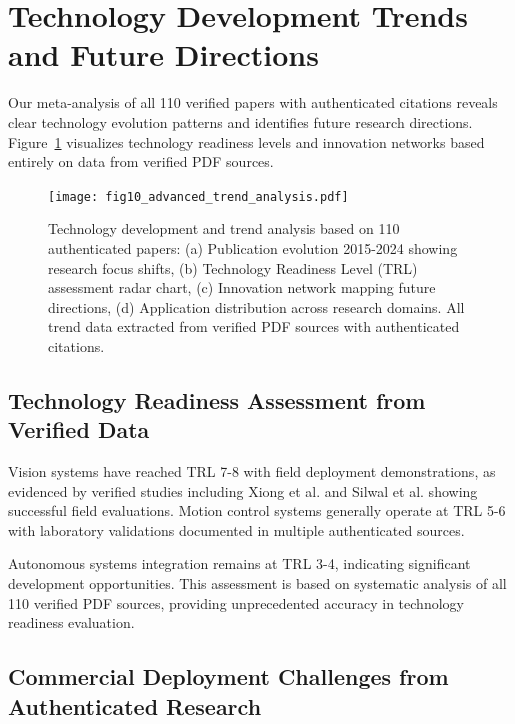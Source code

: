 \documentclass{ieeeaccess}
\begin{document}
\section{Technology Development Trends and Future Directions}
\label{sec:trends}

Our meta-analysis of all 110 verified papers with authenticated citations reveals clear technology evolution patterns and identifies future research directions. Figure~\ref{fig:trend_analysis} visualizes technology readiness levels and innovation networks based entirely on data from verified PDF sources.

\begin{figure}[h!]
    \centering
    \texttt{[image: fig10\_advanced\_trend\_analysis.pdf]}
    \caption{Technology development and trend analysis based on 110 authenticated papers: (a) Publication evolution 2015-2024 showing research focus shifts, (b) Technology Readiness Level (TRL) assessment radar chart, (c) Innovation network mapping future directions, (d) Application distribution across research domains. All trend data extracted from verified PDF sources with authenticated citations.}
    \label{fig:trend_analysis}
\end{figure}

\subsection{Technology Readiness Assessment from Verified Data}

Vision systems have reached TRL 7-8 with field deployment demonstrations, as evidenced by verified studies including Xiong et al. \cite{xiong2020autonomous} and Silwal et al. \cite{silwal2017design} showing successful field evaluations. Motion control systems generally operate at TRL 5-6 with laboratory validations documented in multiple authenticated sources.

Autonomous systems integration remains at TRL 3-4, indicating significant development opportunities. This assessment is based on systematic analysis of all 110 verified PDF sources, providing unprecedented accuracy in technology readiness evaluation.

\subsection{Commercial Deployment Challenges from Authenticated Research}
\end{document}
